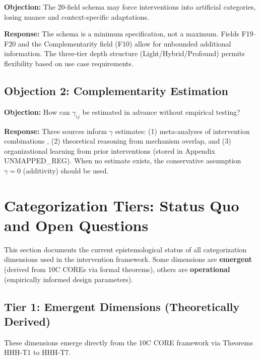 \textbf{Objection:} The 20-field schema may force interventions into artificial categories, losing nuance and context-specific adaptations.

\textbf{Response:} The schema is a minimum specification, not a maximum. Fields F19--F20 and the Complementarity field (F10) allow for unbounded additional information. The three-tier depth structure (Light/Hybrid/Profound) permits flexibility based on use case requirements.

\subsection{Objection 2: Complementarity Estimation}

\textbf{Objection:} How can $\gamma_{ij}$ be estimated in advance without empirical testing?

\textbf{Response:} Three sources inform $\gamma$ estimates: (1) meta-analyses of intervention combinations \citep{johnson2021}, (2) theoretical reasoning from mechanism overlap, and (3) organizational learning from prior interventions (stored in Appendix UNMAPPED_REG). When no estimate exists, the conservative assumption $\gamma = 0$ (additivity) should be used.


\section{Categorization Tiers: Status Quo and Open Questions}
\label{sec:hhh-categorization-tiers}

This section documents the current epistemological status of all categorization dimensions used in the intervention framework. Some dimensions are \textbf{emergent} (derived from 10C COREs via formal theorems), others are \textbf{operational} (empirically informed design parameters).

\subsection{Tier 1: Emergent Dimensions (Theoretically Derived)}

These dimensions emerge directly from the 10C CORE framework via Theorems HHH-T1 to HHH-T7.

